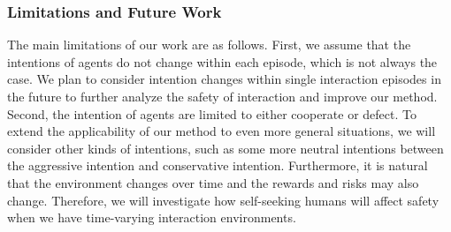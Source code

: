 \documentclass[letterpaper]{article} %
\begin{document}
\subsubsection{Limitations and Future Work}
The main limitations of our work are as follows. First, we assume that the intentions of agents do not change within each episode, which is not always the case. We plan to consider intention changes within single interaction episodes in the future to further analyze the safety of interaction and improve our method. Second, the intention of agents are limited to either cooperate or defect. To extend the applicability of our method to even more general situations, we will consider other kinds of intentions, such as some more neutral intentions between the aggressive intention and conservative intention. Furthermore, it is natural that the environment changes over time and the rewards and risks may also change. Therefore, we will investigate how self-seeking humans will affect safety when we have time-varying interaction environments.
\end{document}
